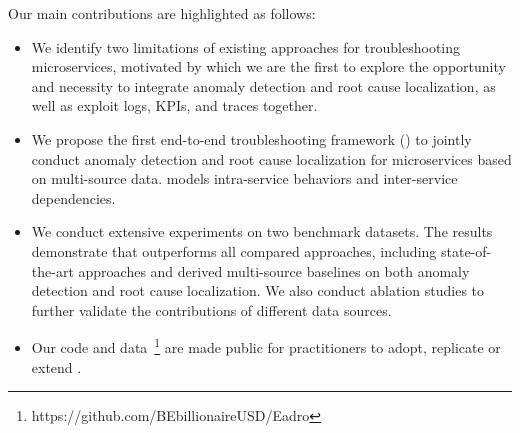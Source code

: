 Our main contributions are highlighted as follows:
\begin{itemize}%
\setlength\itemsep{0em}
   
   \item We identify two limitations of existing approaches for troubleshooting microservices, motivated by which we are the first to explore the opportunity and necessity to integrate anomaly detection and root cause localization, as well as exploit logs, KPIs, and traces together.
    
    \item We propose the first end-to-end troubleshooting framework (\name) to jointly conduct anomaly detection and root cause localization for microservices based on multi-source data. \name models intra-service behaviors and inter-service dependencies.
    
    \item We conduct extensive experiments on two benchmark datasets. The results demonstrate that \name outperforms all compared approaches, including state-of-the-art approaches and derived multi-source baselines on both anomaly detection and root cause localization. We also conduct ablation studies to further validate the contributions of different data sources. 
    
    \item Our code and data~\footnote{https://github.com/BEbillionaireUSD/Eadro} are made public for practitioners to adopt, replicate or extend \name.
    
\end{itemize}
